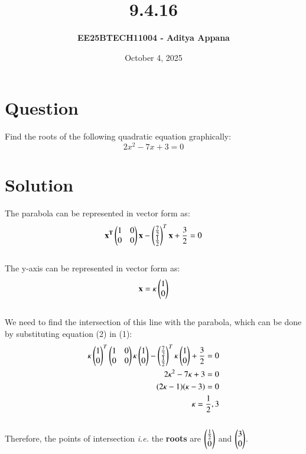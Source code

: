 \documentclass[12pt]{article}
\title{\textbf{9.4.16}}
\author{\textbf{EE25BTECH11004 - Aditya Appana}}
\date{October 4, 2025}
\begin{document}
\maketitle

\section*{Question}
Find the roots of the following quadratic equation graphically:
$$2x^2-7x+3=0$$
\section*{Solution}

The parabola can be represented in vector form as:
\begin{align}
    \mathbf{x^T}\begin{pmatrix}1&0\\0&0\end{pmatrix}\mathbf{x} - \begin{pmatrix}\frac{7}{2} \\ \frac{1}{2}\end{pmatrix}^T\mathbf{x} + \frac{3}{2} = 0
\end{align}\\
The y-axis can be represented in vector form as:
\begin{align}
    \mathbf{x} = \kappa\begin{pmatrix}1\\0\end{pmatrix}
\end{align}\\
We need to find the intersection of this line with the parabola, which can be done by substituting equation (2) in (1):
\begin{align}
    \kappa\begin{pmatrix}1\\0\end{pmatrix}^T\begin{pmatrix}1&0\\0&0\end{pmatrix}\kappa\begin{pmatrix}1\\0\end{pmatrix} - \begin{pmatrix}\frac{7}{2} \\ \frac{1}{2}\end{pmatrix}^T\kappa\begin{pmatrix}1\\0\end{pmatrix} + \frac{3}{2} = 0\\
    2\kappa^2-7\kappa+3=0\\
    (2\kappa - 1)(\kappa -  3) = 0\\
    \kappa = \frac{1}{2}, 3
\end{align}\\
Therefore, the points of intersection \textit{i.e.} the \textbf{roots} are $\begin{pmatrix}\frac{1}{2}\\0\end{pmatrix}$ and $  \begin{pmatrix}3\\0\end{pmatrix}$.
\end{document}
